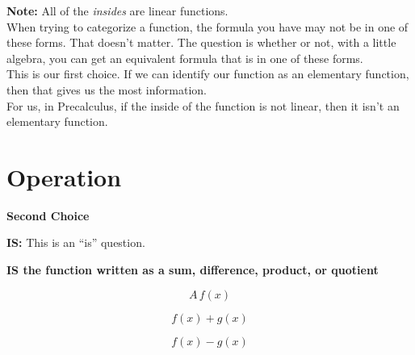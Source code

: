\documentclass{ximera}
\begin{document}
\textbf{Note:} All of the \textit{insides} are linear functions. \\


When trying to categorize a function, the formula you have may not be in one of these forms.  That doesn't matter.  The question is whether or not, with a little algebra, you can get an equivalent formula that is in one of these forms. \\


This is our first choice.  If we can identify our function as an elementary function, then that gives us the most information. \\


For us, in Precalculus, if the inside of the function is not linear, then it isn't an elementary function. \\







































\section*{Operation}

\textbf{\textcolor{purple!85!blue}{Second Choice}} 


\textbf{\textcolor{purple!70!blue}{IS:}}   This is an ``is'' question. \\

\begin{center}
\textbf{\textcolor{red!80!black}{IS the function written as a sum, difference, product, or quotient}}

\end{center}




\[
A \, f(x) 
\]


\[
f(x) + g(x)
\]


\[
f(x) - g(x)
\]
\end{document}
